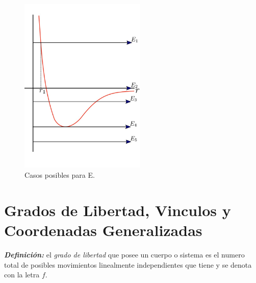 \documentclass[12pt]{report}
\begin{document}
\begin{figure}[H]
	\begin{center}
	\includegraphics[width=6cm]{figura16.jpeg} 
	\caption{ Casos posibles para E.}
	\label{fig.1}
	\end{center}
\end{figure}














































\chapter{Grados de Libertad, Vinculos y Coordenadas Generalizadas}


\textbf{\textit{Definición:}} el \textit{grado de libertad} que posee un cuerpo o sistema es el numero total de posibles movimientos linealmente independientes que tiene y se denota con la letra $f$. \\
\\
\end{document}

